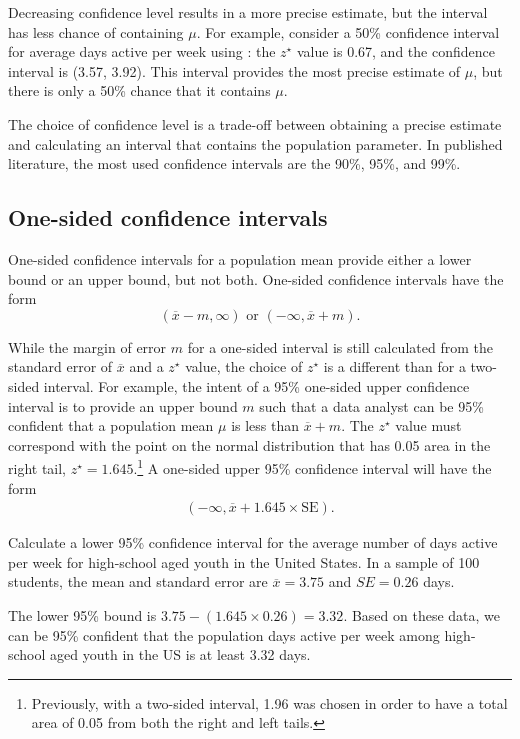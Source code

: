 \begin{spacing}{1.5}
Decreasing confidence level results in a more precise estimate, but the interval has less chance of containing $\mu$. For example, consider a 50\% confidence interval for average days active per week using : the $z^{\star}$ value is 0.67, and the confidence interval is (3.57, 3.92). This interval provides the most precise estimate of $\mu$, but there is only a 50\% chance that it contains $\mu$.

The choice of confidence level is a trade-off between obtaining a precise estimate and calculating an interval that contains the population parameter. In published literature, the most used confidence intervals are the 90\%, 95\%, and 99\%. 

\subsection{One-sided confidence intervals}
\label{onesidedCIs}

One-sided confidence intervals for a population mean provide either a lower bound or an upper bound, but not both.  One-sided confidence intervals have the form
\[
(\overline{x} - m, \infty) \text{ or } (-\infty, \overline{x} + m).
\]

While the margin of error $m$ for a one-sided interval is still calculated from the standard error of $\overline{x}$ and a $z^\star$ value, the choice of $z^\star$ is a different than for a two-sided interval. For example, the intent of a 95\% one-sided upper confidence interval is to provide an upper bound $m$ such that a data analyst can be 95\% confident that a population mean $\mu$ is less than $\overline{x} + m$. The $z^\star$ value must correspond with the point on the normal distribution that has 0.05 area in the right tail, $z^{\star} = 1.645$.\footnote{Previously, with a two-sided interval, 1.96 was chosen in order to have a total area of 0.05 from both the right and left tails.} A one-sided upper 95\%  confidence interval will have the form
\begin{align*}
(-\infty, \overline{x} + 1.645 \times \text{SE}).
\end{align*}

\begin{example}
	{Calculate a lower 95\% confidence interval for the average number of days active per week for high-school aged youth in the United States. In a sample of 100 students, the mean and standard error are $\overline{x} = 3.75$ and $SE = 0.26$ days.}
	
The lower 95\% bound is $3.75 - (1.645 \times 0.26) = 3.32$. Based on these data, we can be 95\% confident that the population days active per week among high-school aged youth in the US is at least 3.32 days.
\end{example}


\end{spacing}
